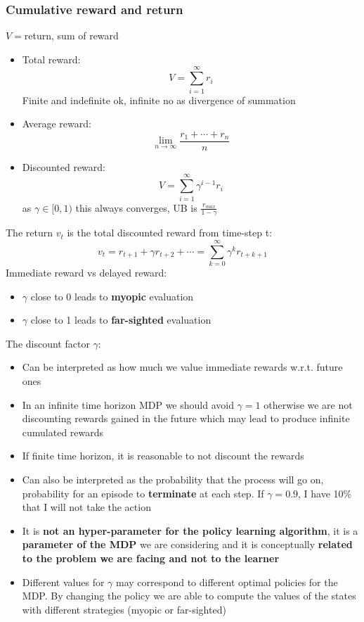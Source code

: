 \subsubsection{Cumulative reward and return}
    $V=$return, sum of reward
    \begin{itemize}
        \item Total reward: $$V=\sum_{i=1}^\infty r_i$$ Finite and indefinite ok, infinite no as divergence of summation
        \item Average reward: $$\lim_{n\rightarrow\infty}\frac{r_1+\cdots+r_n}{n}$$
        \item Discounted reward: $$V=\sum_{i=1}^\infty \gamma^{i-1}r_i$$ as $\gamma \in [0,1)$ this always converges, UB is $\frac{r_{max}}{1-\gamma}$
    \end{itemize}
    The return $v_t$ is the total discounted reward from time-step t:
    $$v_t=r_{t+1}+\gamma r_{t+2}+\cdots=\sum_{k=0}^\infty \gamma^{k}r_{t+k+1}$$
    Immediate reward vs delayed reward:
    \begin{itemize}
        \item $\gamma$ close to 0 leads to \textbf{myopic} evaluation
        \item $\gamma$ close to 1 leads to \textbf{far-sighted} evaluation
    \end{itemize}
    The discount factor $\gamma$:
    \begin{itemize}
        \item Can be interpreted as how much we value immediate rewards w.r.t. future ones
        \item In an infinite time horizon MDP we should avoid $\gamma=1$ otherwise we are not discounting rewards gained in the future which may lead to produce infinite cumulated rewards
        \item If finite time horizon, it is reasonable to not discount the rewards
        \item Can also be interpreted as the probability that the process will go on, probability for an episode to \textbf{terminate} at each step. If $\gamma=0.9$, I have 10\% that I will not take the action
        \item It is \textbf{not an hyper-parameter for the policy learning algorithm}, it is a \textbf{parameter of the MDP} we are considering and it is conceptually \textbf{related to the problem we are facing and not to the learner}
        \item Different values for $\gamma$ may correspond to different optimal policies for the MDP. By changing the policy we are able to compute the values of the states with different strategies (myopic or far-sighted)
    \end{itemize}

